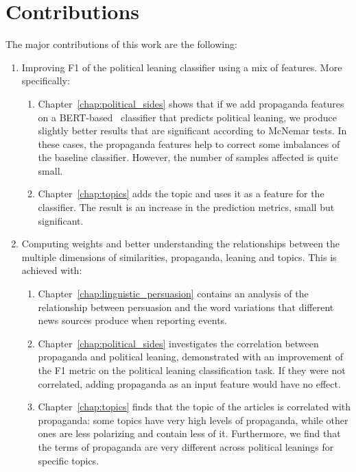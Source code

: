 \section{\statusgreen Contributions}
\label{sec:intro_contributions}

The major contributions of this work are the following:
\begin{enumerate}
    \item Improving F1 of the political leaning classifier using a mix of features. More specifically:
          \begin{enumerate}
              \item Chapter~\ref{chap:political_sides}  shows that if we add propaganda features on a BERT-based~\citep{devlin2018bert} classifier that predicts political leaning, we produce slightly better results that are significant according to McNemar tests. In these cases, the propaganda features help to correct some imbalances of the baseline classifier. However, the number of samples affected is quite small.
              \item Chapter~\ref{chap:topics} adds the topic and uses it as a feature for the classifier. The result is an increase in the prediction metrics, small but significant.
          \end{enumerate}
    \item Computing weights and better understanding the relationships between the multiple dimensions of similarities, propaganda, leaning and topics. This is achieved with:
          \begin{enumerate}
              \item Chapter~\ref{chap:linguistic_persuasion} contains an analysis of the relationship between persuasion and the word variations that different news sources produce when reporting events.
              \item Chapter~\ref{chap:political_sides} investigates the correlation between propaganda and political leaning, demonstrated with an improvement of the F1 metric on the political leaning classification task. If they were not correlated, adding propaganda as an input feature would have no effect.
              \item Chapter~\ref{chap:topics} finds that the topic of the articles is correlated with propaganda: some topics have very high levels of propaganda, while other ones are less polarizing and contain less of it. Furthermore, we find that the terms of propaganda are very different across political leanings for specific topics. %

\end{enumerate}
\end{enumerate}
